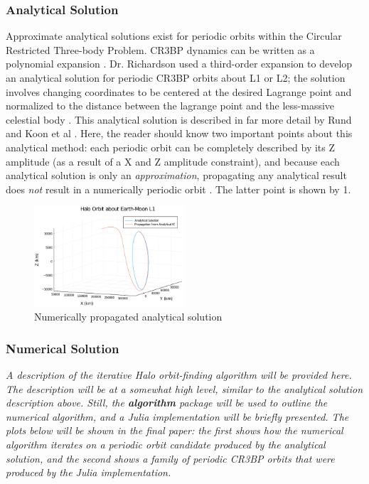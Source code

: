 \documentclass[conf]{new-aiaa}
\begin{document}
\begin{multicols*}{2}
\subsubsection{Analytical Solution}
Approximate analytical solutions exist for periodic orbits within
the Circular Restricted Three-body Problem. CR3BP dynamics can 
be written as a polynomial expansion 
\cite{koon2008dynamical}. 
Dr. Richardson used a third-order expansion to develop an 
analytical solution for periodic CR3BP orbits about L1 or L2;
the solution involves changing coordinates to be centered 
at the desired Lagrange point and normalized to the 
distance between the lagrange point and the less-massive 
celestial body 
\cite{koon2008dynamical} 
\cite{richardson1980analytical}
\cite{rund2018interplanetary}.
This analytical solution is described in far more detail 
by Rund and Koon et al 
\cite{rund2018interplanetary} 
\cite{koon2008dynamical}.
Here, the reader should know two important points 
about this analytical method: each periodic orbit 
can be completely described by its Z amplitude 
(as a result of a X and Z amplitude constraint), 
and because each analytical solution is only 
an \textit{approximation}, propagating any 
analytical result does \textit{not} result 
in a numerically periodic orbit
\cite{koon2008dynamical}.
The latter point is shown by \figurename{1}.

\vskip -0.3cm
\begin{figure}[H]
    \hskip -0.3cm
    \includegraphics[width=0.5\textwidth]{analytical_propagation.png}
    \caption{Numerically propagated analytical solution}
\end{figure}

\subsubsection{Numerical Solution}

\textit{
    A description of the iterative Halo orbit-finding 
    algorithm will be provided here. The description 
    will be at a somewhat high level, similar to the 
    analytical solution description above. Still,
    the \textbf{algorithm} package will be used to outline
    the numerical algorithm, and a Julia implementation
    will be briefly presented. The plots below 
    will be shown in the final paper: the first 
    shows how the numerical algorithm iterates on 
    a periodic orbit candidate produced by the 
    analytical solution, and the second
    shows a family of periodic CR3BP orbits 
    that were produced by the Julia implementation.
}


\end{multicols*}
\end{document}
